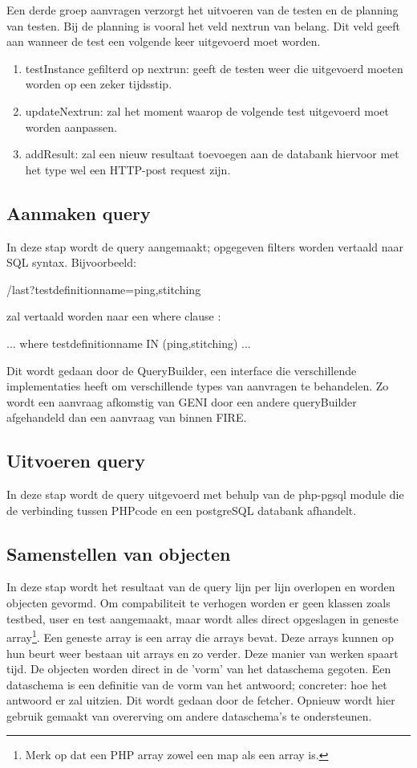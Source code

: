 \clearpage
Een derde groep aanvragen verzorgt het uitvoeren van de testen en de planning van testen. Bij de planning is vooral het veld nextrun van belang. Dit veld geeft aan wanneer de test een volgende keer uitgevoerd moet worden.
\begin{enumerate}
\item testInstance gefilterd op nextrun: geeft de testen weer die uitgevoerd moeten worden op een zeker tijdsstip.
\item updateNextrun: zal het moment waarop de volgende test uitgevoerd moet worden aanpassen.
\item addResult: zal een nieuw resultaat toevoegen aan de databank hiervoor met het type wel een HTTP-post request zijn.
\end{enumerate}

\subsection{Aanmaken query}
\npar 
In deze stap wordt de query aangemaakt; opgegeven filters worden vertaald naar SQL syntax. Bijvoorbeeld:
\begin{lt}
/last?testdefinitionname=ping,stitching
\end{lt}
zal vertaald worden naar een where clause :
\begin{lt}
... where testdefinitionname IN (ping,stitching) ...
\end{lt}
\npar
Dit wordt gedaan door de QueryBuilder, een interface die verschillende implementaties heeft om verschillende types van aanvragen te behandelen. Zo wordt een aanvraag afkomstig van GENI door een andere queryBuilder afgehandeld dan een aanvraag van binnen FIRE.

\subsection{Uitvoeren query}
\npar
In deze stap wordt de query uitgevoerd met behulp van de php-pgsql module die de verbinding tussen PHPcode en een postgreSQL databank afhandelt.
\clearpage
\subsection{Samenstellen van objecten}
\npar
In deze stap wordt het resultaat van de query lijn per lijn overlopen en worden objecten gevormd. Om compabiliteit te verhogen worden er geen klassen zoals testbed, user en test aangemaakt, maar wordt alles direct opgeslagen in geneste array\footnote{Merk op dat een PHP array zowel een map als een array is.}. Een geneste array is een array die arrays bevat. Deze arrays kunnen op hun beurt weer bestaan uit arrays en zo verder. 
\npar
Deze manier van werken spaart tijd. De objecten worden direct in de 'vorm' van het dataschema gegoten. Een dataschema is een definitie van de vorm van het antwoord; concreter: hoe het antwoord er zal uitzien. Dit wordt gedaan door de fetcher. Opnieuw wordt hier gebruik gemaakt van overerving om andere dataschema's te ondersteunen.
